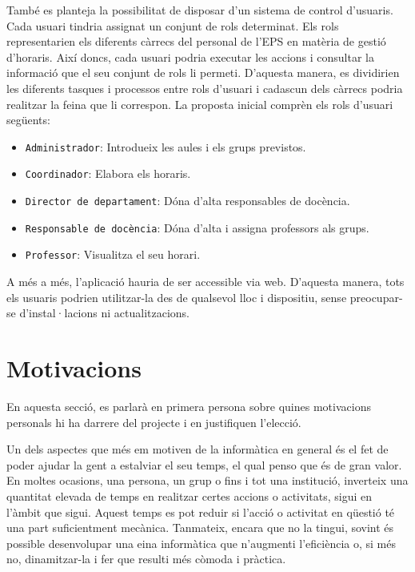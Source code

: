 \documentclass[a4paper,12pt]{ThesisStyle}
\begin{document}
També es planteja la possibilitat de disposar d'un sistema de control d'usuaris. Cada usuari tindria assignat un conjunt de rols determinat. Els rols representarien els diferents càrrecs del personal de l'EPS en matèria de gestió d'horaris. Així doncs, cada usuari podria executar les accions i consultar la informació que el seu conjunt de rols li permeti. D'aquesta manera, es dividirien les diferents tasques i processos entre rols d'usuari i cadascun dels càrrecs podria realitzar la feina que li correspon. La proposta inicial comprèn els rols d'usuari següents:
\begin{itemize}
  \item \texttt{Administrador}: Introdueix les aules i els grups previstos.
  \item \texttt{Coordinador}: Elabora els horaris.
  \item \texttt{Director de departament}: Dóna d'alta responsables de docència.
  \item \texttt{Responsable de docència}: Dóna d'alta i assigna professors als grups.
  \item \texttt{Professor}: Visualitza el seu horari.
\end{itemize}

A més a més, l'aplicació hauria de ser accessible via web. D'aquesta manera, tots els usuaris podrien utilitzar-la des de qualsevol lloc i dispositiu, sense preocupar-se d'instal·lacions ni actualitzacions.

\section{Motivacions}
\label{sec:motivacions}

En aquesta secció, es parlarà en primera persona sobre quines motivacions personals hi ha darrere del projecte i en justifiquen l'elecció.

Un dels aspectes que més em motiven de la informàtica en general és el fet de poder ajudar la gent a estalviar el seu temps, el qual penso que és de gran valor. En moltes ocasions, una persona, un grup o fins i tot una institució, inverteix una quantitat elevada de temps en realitzar certes accions o activitats, sigui en l'àmbit que sigui. Aquest temps es pot reduir si l'acció o activitat en qüestió té una part suficientment mecànica. Tanmateix, encara que no la tingui, sovint és possible desenvolupar una eina informàtica que n'augmenti l'eficiència o, si més no, dinamitzar-la i fer que resulti més còmoda i pràctica.
\end{document}
